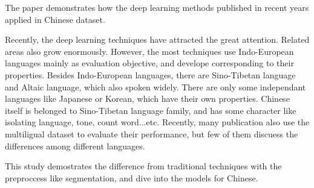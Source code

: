 \begin{abstractEN}

The paper demonstrates how the deep learning methods published in recent years applied in Chinese dataset.

Recently, the deep learning techniques have attracted the great attention. Related areas also grow enormously. 
However, the most techniques use Indo-European languages mainly as evaluation objective, and develope corresponding to their properties.  
Besides Indo-European languages, there are Sino-Tibetan language and Altaic language, which also spoken widely. 
There are only some independant languages like Japanese or Korean, which have their own properties.
Chinese itself is belonged to Sino-Tibetan language family, and has some character like isolating language, tone, count word...etc.
Recently, many publication also use the multiligual dataset to evaluate their performance, but few of them discuess the differences among different languages. 

This study demostrates the difference from traditional techniques with the preproccess like segmentation, and dive into the models for Chinese. 

\end{abstractEN}

